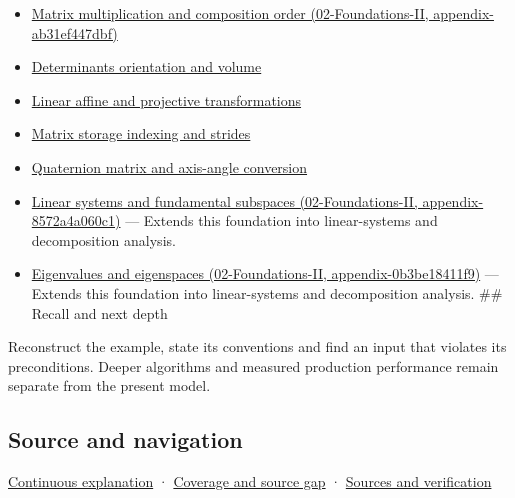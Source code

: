 \begin{itemize}
\tightlist
\item
  \href{../02-Foundations-II/main.pdf\#nameddest=appendix-ab31ef447dbf}{Matrix multiplication and composition order (02-Foundations-II, appendix-ab31ef447dbf)}
\item
  \hyperref[appendix-da478be01d02]{Determinants orientation and volume}
\item
  \hyperref[appendix-0bf0ca73f735]{Linear affine and projective transformations}
\item
  \hyperref[appendix-ffdc1d4e5350]{Matrix storage indexing and strides}
\item
  \hyperref[appendix-26d8da71f6c4]{Quaternion matrix and axis-angle conversion}
\item
  \href{../02-Foundations-II/main.pdf\#nameddest=appendix-8572a4a060c1}{Linear systems and fundamental subspaces (02-Foundations-II, appendix-8572a4a060c1)} --- Extends this foundation into linear-systems and decomposition analysis.
\item
  \href{../02-Foundations-II/main.pdf\#nameddest=appendix-0b3be18411f9}{Eigenvalues and eigenspaces (02-Foundations-II, appendix-0b3be18411f9)} --- Extends this foundation into linear-systems and decomposition analysis. \#\# Recall and next depth
\end{itemize}

Reconstruct the example, state its conventions and find an input that violates its preconditions. Deeper algorithms and measured production performance remain separate from the present model.

\subsection{Source and navigation}\label{appendix-bd39c3bf5d64-source-and-navigation}

\hyperref[01-foundations-i-ch018-keep-the-promises-visible-while-moving-between-representations]{Continuous explanation} · \hyperref[appendix-fd090d982a15-phase-7---parts-601-700]{Coverage and source gap} · \hyperref[appendix-a103e7846d21-phase-7---source-analysis-and-verification]{Sources and verification}
